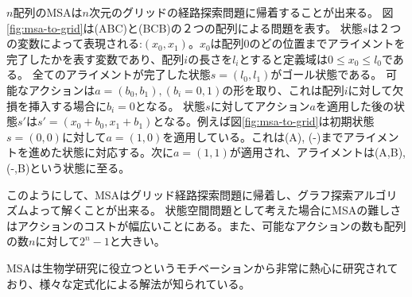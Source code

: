 \documentclass[b5paper]{report}
\begin{document}
$n$配列のMSAは$n$次元のグリッドの経路探索問題に帰着することが出来る\cite{korf:2000}。
図\ref{fig:msa-to-grid}は(ABC)と(BCB)の２つの配列による問題を表す。
状態$s$は２つの変数によって表現される:$(x_0, x_1)$。$x_0$は配列0のどの位置までアライメントを完了したかを表す変数であり、配列$i$の長さを$l_i$とすると定義域は$0 \leq x_0 \leq l_0$である。
全てのアライメントが完了した状態$s=(l_0, l_1)$がゴール状態である。
可能なアクションは$a=(b_0, b_1), (b_i=0, 1)$の形を取り、これは配列$i$に対して欠損を挿入する場合に$b_i=0$となる。
状態$s$に対してアクション$a$を適用した後の状態$s'$は$s'=(x_0+b_0, x_1+b_1)$となる。例えば図\ref{fig:msa-to-grid}は初期状態$s=(0,0)$に対して$a=(1,0)$を適用している。これは(A), (-)までアライメントを進めた状態に対応する。次に$a=(1,1)$が適用され、アライメントは(A,B), (-,B)という状態に至る。

このようにして、MSAはグリッド経路探索問題に帰着し、グラフ探索アルゴリズムよって解くことが出来る。
状態空間問題として考えた場合にMSAの難しさはアクションのコストが幅広いことにある。また、可能なアクションの数も配列の数$n$に対して$2^n-1$と大きい。

MSAは生物学研究に役立つというモチベーションから非常に熱心に研究されており、様々な定式化による解法が知られている\cite{edgar2006multiple}。



\begin{figure}
\centering
{} \hspace{4pt}
 \hspace{4pt}
\end{figure}
\end{document}
